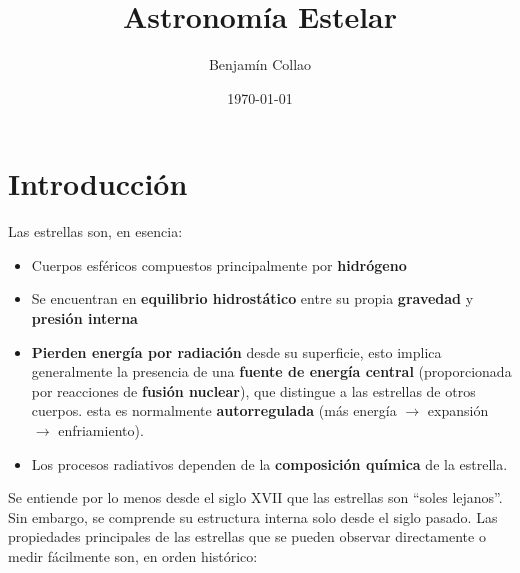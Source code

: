 \documentclass[11pt,letterpaper]{article}
\title{\textbf{Astronomía Estelar}}
\author{Benjamín Collao}
\date{\today}
\begin{document}
\maketitle

\tableofcontents
\newpage

\section{Introducción}

Las estrellas son, en esencia:
\begin{itemize}
    \item Cuerpos esféricos compuestos principalmente por \textbf{hidrógeno}
    \item Se encuentran en \textbf{equilibrio hidrostático} entre su propia \textbf{gravedad} y \textbf{presión interna}
    \item \textbf{Pierden energía por radiación} desde su superficie, esto implica generalmente la presencia de una \textbf{fuente de energía central} (proporcionada por reacciones de \textbf{fusión nuclear}), que distingue a las estrellas de otros cuerpos. 
    esta es normalmente \textbf{autorregulada} (más energía $\to$ expansión $\to$ enfriamiento).
    \item Los procesos radiativos dependen de la \textbf{composición química} de la estrella.
\end{itemize}

Se entiende por lo menos desde el siglo XVII que las estrellas son ``soles lejanos''. Sin embargo, se comprende su estructura interna solo desde el siglo pasado. Las propiedades principales de las estrellas que se pueden observar directamente o medir fácilmente son, en orden histórico:
\end{document}
